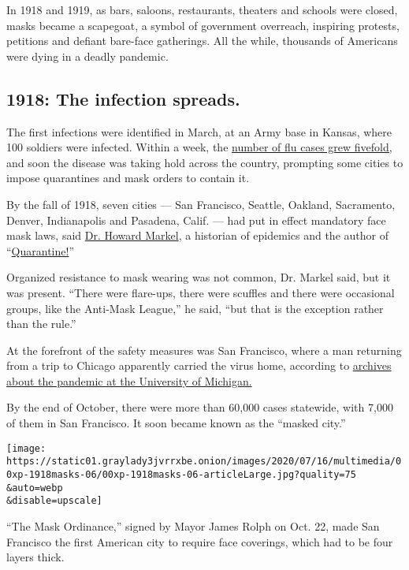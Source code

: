In 1918 and 1919, as bars, saloons, restaurants, theaters and schools
were closed, masks became a scapegoat, a symbol of government overreach,
inspiring protests, petitions and defiant bare-face gatherings. All the
while, thousands of Americans were dying in a deadly pandemic.

\hypertarget{1918-the-infection-spreads}{%
\subsection{1918: The infection
spreads.}\label{1918-the-infection-spreads}}

The first infections were identified in March, at an Army base in
Kansas, where 100 soldiers were infected. Within a week, the
\href{https://www.cdc.gov/flu/pandemic-resources/1918-commemoration/pandemic-timeline-1918.htm}{number
of flu cases grew fivefold,} and soon the disease was taking hold across
the country, prompting some cities to impose quarantines and mask orders
to contain it.

By the fall of 1918, seven cities --- San Francisco, Seattle, Oakland,
Sacramento, Denver, Indianapolis and Pasadena, Calif. --- had put in
effect mandatory face mask laws, said
\href{http://chm.med.umich.edu/about/howard-markel-m-d-ph-d/}{Dr. Howard
Markel}, a historian of epidemics and the author of
``\href{https://jhupbooks.press.jhu.edu/title/quarantine}{Quarantine!}''

Organized resistance to mask wearing was not common, Dr. Markel said,
but it was present. ``There were flare-ups, there were scuffles and
there were occasional groups, like the Anti-Mask League,'' he said,
``but that is the exception rather than the rule.''

At the forefront of the safety measures was San Francisco, where a man
returning from a trip to Chicago apparently carried the virus home,
according to
\href{http://www.influenzaarchive.org/cities/city-sanfrancisco.html}{archives
about the pandemic at the University of Michigan.}

By the end of October, there were more than 60,000 cases statewide, with
7,000 of them in San Francisco. It soon became known as the ``masked
city.''

\texttt{[image: https://static01.graylady3jvrrxbe.onion/images/2020/07/16/multimedia/00xp-1918masks-06/00xp-1918masks-06-articleLarge.jpg?quality=75\\\&auto=webp\\\&disable=upscale]}

``The Mask Ordinance,'' signed by Mayor James Rolph on Oct. 22, made San
Francisco the first American city to require face coverings, which had
to be four layers thick.

